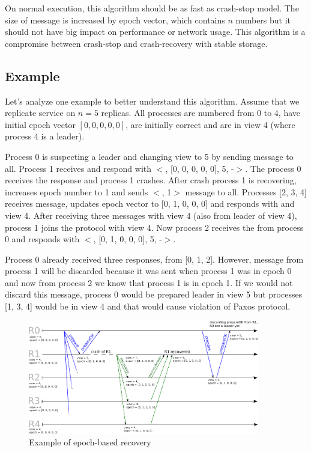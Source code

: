 On normal execution, this algorithm should be as fast as crash-stop model. \linebreak The size of \prepareOK message is increased by epoch vector, which contains $n$ numbers but it should not have big impact on performance or network usage. This algorithm is a compromise between crash-stop and crash-recovery with stable storage.  

\subsection*{Example}

Let's analyze one example to better understand this algorithm. Assume that we replicate service on $n = 5$ replicas. All processes are numbered from 0 to 4, have initial epoch vector $[0, 0, 0, 0, 0]$, are initially correct and are in view 4 (where process 4 is a leader).

Process 0 is suspecting a leader and changing view to 5 by sending \prepare message to all. Process 1 receives \prepare and respond with $<$\prepareOK[], [0, 0, 0, 0, 0], 5, -$>$. The process 0 receives the response and process 1 crashes. After crash process 1 is recovering, increases epoch number to 1 and sends $<$\recovery[], 1$>$ message to all. Processes [2, 3, 4] receives \recovery message, updates epoch vector to [0, 1, 0, 0, 0] and responds with \recoveryAnswer and view 4. After receiving three \recoveryAnswer messages with view 4 (also from leader of view 4), process 1 joins the protocol with view 4. Now process 2 receives the \prepare from process 0 and responds with $<$\prepareOK[], [0, 1, 0, 0, 0], 5, -$>$.

Process 0 already received three \prepareOK responses, from [0, 1, 2]. However, message from process 1 will be discarded because it was sent when process 1 was in epoch 0 and now from process 2 we know that process 1 is in epoch 1. If we would not discard this message, process 0 would be prepared leader in view 5 but processes [1, 3, 4] would be in view 4 and that would cause violation of Paxos protocol.

\begin{figure}[h]
 \centering
 \includegraphics[keepaspectratio, width=0.9\textwidth]{recovery/epoch_recovery.pdf}
 \caption{Example of epoch-based recovery}
 \label{fig:epoch_based_recovery}
\end{figure}

